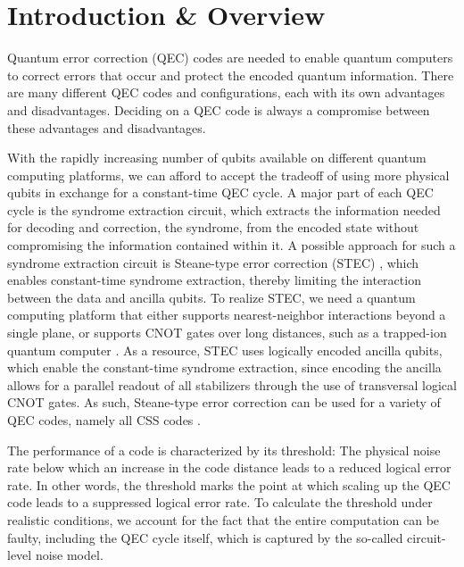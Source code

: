 \chapter{Introduction \& Overview}

Quantum error correction (QEC) codes are needed to enable quantum computers to correct errors that occur and protect the encoded quantum information.  
There are many different QEC codes and configurations, each with its own advantages and disadvantages.
Deciding on a QEC code is always a compromise between these advantages and disadvantages.


With the rapidly increasing number of qubits available on different quantum computing platforms, 
we can afford to accept the tradeoff of using more physical qubits in exchange for a constant-time QEC cycle.
A major part of each QEC cycle is the syndrome extraction circuit, 
which extracts the information needed for decoding and correction, the syndrome, from the encoded state without compromising the information contained within it. 
A possible approach for such a syndrome extraction circuit is Steane-type error correction (STEC) \cite{steane_type_EC_og_paper}, 
which enables constant-time syndrome extraction, 
thereby limiting the interaction between the data and ancilla qubits.
To realize STEC, we need a quantum computing platform that either supports nearest-neighbor interactions beyond a single plane, 
or supports CNOT gates over long distances, such as a trapped-ion quantum computer \cite{friederike_steane}. 
As a resource, STEC uses logically encoded ancilla qubits, which enable the constant-time syndrome extraction, 
since encoding the ancilla allows for a parallel readout of all stabilizers through the use of transversal logical CNOT gates.
As such, Steane-type error correction can be used for a variety of QEC codes, namely all CSS codes \cite{CSS1,CSS2}. 


The performance of a code is characterized by its threshold: 
The physical noise rate below which an increase in the code distance leads to a reduced logical error rate.
In other words, the threshold marks the point at which scaling up the QEC code leads to a suppressed logical error rate.
To calculate the threshold under realistic conditions, 
we account for the fact that the entire computation can be faulty, including the QEC cycle itself,
which is captured by the so-called circuit-level noise model.

